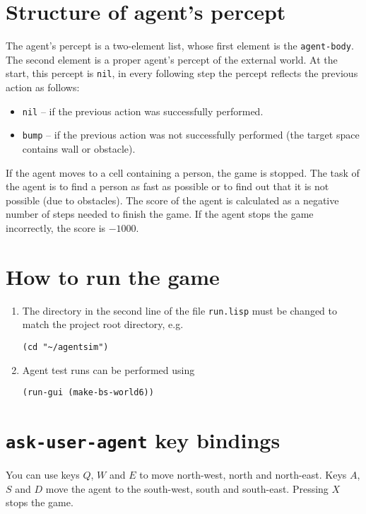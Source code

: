 \documentclass[a4paper,12pt]{article}
\begin{document}
\section*{Structure of agent's percept}
The agent's percept is a two-element list, whose first element is the \texttt{agent-body}. The second element is a
proper agent's percept of the external world. At the start, this percept is \texttt{nil}, in every following step the
percept reflects the previous action as follows:
\begin{itemize}
\item \texttt{nil} -- if the previous action was successfully performed.
\item \texttt{bump} -- if the previous action was not successfully performed (the target space contains wall or
obstacle).
\end{itemize}

If the agent moves to a cell containing a person, the game is stopped. The task of the agent is to find a person as
fast as possible or to find out that it is not possible (due to obstacles). The score of the agent is calculated as a
negative number of steps needed to finish the game. If the agent stops the game incorrectly, the score is $-1000$.

\section*{How to run the game}
\begin{enumerate}
\item The directory in the second line of the file \texttt{run.lisp} must be changed to match the project root directory, e.g.
\begin{verbatim}
(cd "~/agentsim")
\end{verbatim}

\item Agent test runs can be performed using

\begin{verbatim}
(run-gui (make-bs-world6))
\end{verbatim}

\end{enumerate}

\section*{\texttt{ask-user-agent} key bindings}
You can use keys $Q$, $W$ and $E$ to move north-west, north and north-east. Keys $A$, $S$ and $D$ move the agent to the
south-west, south and south-east. Pressing $X$ stops the game.
\end{document}
